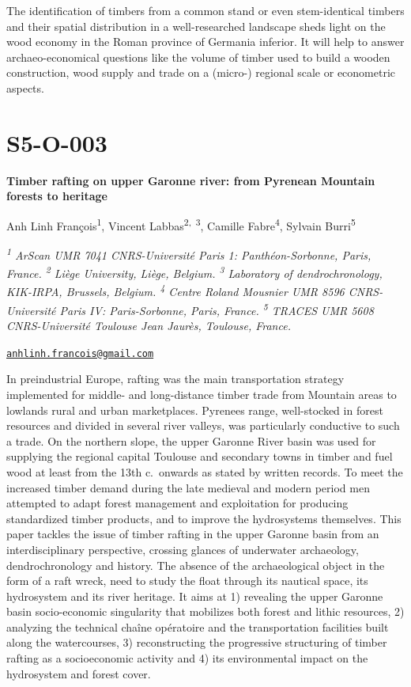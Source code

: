 \documentclass[
]{book}
\begin{document}
The identification of timbers from a common stand or even stem-identical timbers and their spatial distribution in a well-researched landscape sheds light on the wood economy in the Roman province of Germania inferior. It will help to answer archaeo-economical questions like the volume of timber used to build a wooden construction, wood supply and trade on a (micro-) regional scale or econometric aspects.

\hypertarget{s5-o-003}{%
\section*{S5-O-003}\label{s5-o-003}}

\textbf{Timber rafting on upper Garonne river: from Pyrenean Mountain forests to heritage}

Anh Linh François\textsuperscript{1}, Vincent Labbas\textsuperscript{2,~3}, Camille Fabre\textsuperscript{4}, Sylvain Burri\textsuperscript{5}

\emph{\textsuperscript{1} ArScan UMR 7041 CNRS-Université Paris 1: Panthéon-Sorbonne, Paris, France. \textsuperscript{2} Liège University, Liège, Belgium. \textsuperscript{3} Laboratory of dendrochronology, KIK-IRPA, Brussels, Belgium. \textsuperscript{4} Centre Roland Mousnier UMR 8596 CNRS-Université Paris IV: Paris-Sorbonne, Paris, France. \textsuperscript{5} TRACES UMR 5608 CNRS-Université Toulouse Jean Jaurès, Toulouse, France.}

\href{mailto:anhlinh.francois@gmail.com}{\nolinkurl{anhlinh.francois@gmail.com}}

In preindustrial Europe, rafting was the main transportation strategy implemented for middle- and long-distance timber trade from Mountain areas to lowlands rural and urban marketplaces. Pyrenees range, well-stocked in forest resources and divided in several river valleys, was particularly conductive to such a trade. On the northern slope, the upper Garonne River basin was used for supplying the regional capital Toulouse and secondary towns in timber and fuel wood at least from the 13th c.~onwards as stated by written records. To meet the increased timber demand during the late medieval and modern period men attempted to adapt forest management and exploitation for producing standardized timber products, and to improve the hydrosystems themselves. This paper tackles the issue of timber rafting in the upper Garonne basin from an interdisciplinary perspective, crossing glances of underwater archaeology, dendrochronology and history. The absence of the archaeological object in the form of a raft wreck, need to study the float through its nautical space, its hydrosystem and its river heritage. It aims at 1) revealing the upper Garonne basin socio-economic singularity that mobilizes both forest and lithic resources, 2) analyzing the technical chaîne opératoire and the transportation facilities built along the watercourses, 3) reconstructing the progressive structuring of timber rafting as a socioeconomic activity and 4) its environmental impact on the hydrosystem and forest cover.
\end{document}
